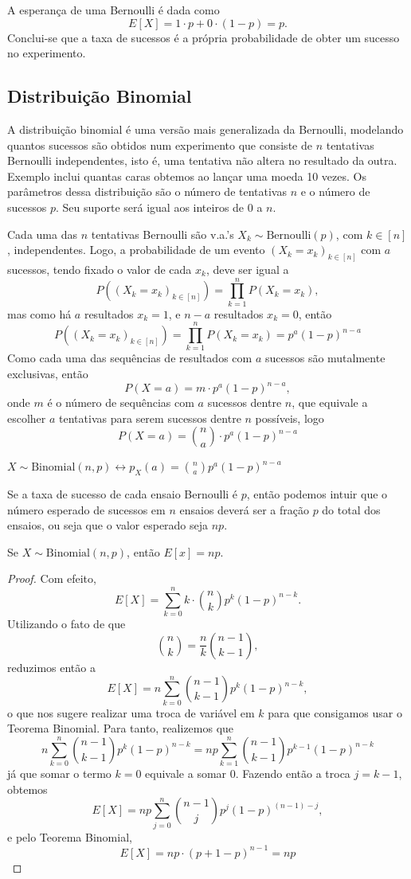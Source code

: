 A esperança de uma Bernoulli é dada como
\[
	E[X] = 1 \cdot p + 0 \cdot (1-p) = p.
\]
Conclui-se que a taxa de sucessos é a própria probabilidade de obter um sucesso no
experimento.

\subsection{Distribuição Binomial}

A distribuição binomial é uma versão mais generalizada da Bernoulli, modelando quantos
sucessos são obtidos num experimento que consiste de $n$ tentativas Bernoulli
independentes, isto é, uma tentativa não altera no resultado da outra. Exemplo inclui
quantas caras obtemos ao lançar uma moeda 10 vezes. Os parâmetros dessa distribuição são
o número de tentativas $n$ e o número de sucessos $p$. Seu suporte será igual aos inteiros
de 0 a $n$.

Cada uma das $n$ tentativas Bernoulli são v.a.'s $X_k \sim \mathrm{Bernoulli}(p)$,
com $k \in [n]$, independentes. Logo, a probabilidade de um evento
$(X_k = x_k)_{k \in [n]}$ com $a$ sucessos, tendo fixado o valor de cada $x_k$,
deve ser igual a
\[
	P((X_k = x_k)_{k \in [n]}) = \prod_{k = 1}^n P(X_k = x_k),
\]
mas como há $a$ resultados $x_k = 1$, e $n-a$ resultados $x_k = 0$, então
\[
	P((X_k = x_k)_{k \in [n]}) = \prod_{k = 1}^n P(X_k = x_k) = p^{a} (1-p)^{n - a}
\]
Como cada uma das sequências de resultados com $a$ sucessos são mutalmente exclusivas,
então
\[
	P(X = a) = m \cdot p^{a} (1-p)^{n - a},
\]
onde $m$ é o número de sequências com $a$ sucessos dentre $n$, que equivale a
escolher $a$ tentativas para serem sucessos dentre $n$ possíveis, logo
\[
	P(X = a) = \binom{n}{a} \cdot p^{a} (1-p)^{n - a}
\]

\begin{def:binomial}
$
	X \sim \mathrm{Binomial}(n, p) \longleftrightarrow p_X(a) = \binom{n}{a} p^a (1-p)^{n-a}
$
\end{def:binomial}

Se a taxa de sucesso de cada ensaio Bernoulli é $p$, então podemos intuir que o número
esperado de sucessos em $n$ ensaios deverá ser a fração $p$ do total dos ensaios, ou seja
que o valor esperado seja $np$.

\begin{prop:esperanca binomial}
Se $X \sim \mathrm{Binomial}(n, p)$, então \(E[x] = np\).
\begin{proof}
	Com efeito,
	\[
		E[X] = \sum_{k=0}^n k \cdot \binom{n}{k} p^k (1-p)^{n-k}.
	\]
	Utilizando o fato de que
	\[
		\binom{n}{k} = \frac{n}{k} \binom{n-1}{k-1},
	\]
	reduzimos então a
	\[
		E[X] = n\sum_{k=0}^n \binom{n-1}{k-1} p^k (1-p)^{n-k},
	\]
	o que nos sugere realizar uma troca de variável em $k$ para que consigamos usar o
	Teorema Binomial. Para tanto, realizemos que
	\[
		n\sum_{k=0}^n \binom{n-1}{k-1} p^k (1-p)^{n-k} = np \sum_{k=1}^n\binom{n-1}{k-1}p^{k-1}(1-p)^{n-k}
	\]
	já que somar o termo $k=0$ equivale a somar 0. Fazendo então a troca $j = k - 1$, obtemos
	\[
		E[X] = np \sum_{j=0}^n\binom{n-1}{j}p^{j}(1-p)^{(n-1)-j},
	\]
	e pelo Teorema Binomial,
	\[
		E[X] = np \cdot (p + 1 - p)^{n-1} = np
	\]
\end{proof}
\end{prop:esperanca binomial}

